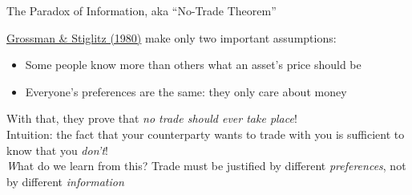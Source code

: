 \documentclass[aspectratio=169]{beamer}
\begin{document}
\begin{frame}{The Paradox of Information, aka ``No-Trade Theorem''}

\hyperlink{https://www.jstor.org/stable/1805228}{Grossman \& Stiglitz (1980)} make only two important assumptions: 

\begin{itemize}
    \item Some people know more than others what an asset's price should be 
    \item Everyone's preferences are the same: they only care about money \pause 
\end{itemize} \vfill 

With that, they prove that \emph{no trade should ever take place}! \pause \\
Intuition: the fact that your counterparty wants to trade with you is sufficient to know that you \emph{don't}!\\ \emph 
What do we learn from this? Trade must be justified by different \emph{preferences}, not by different \emph{information}


\end{frame}
\end{document}
